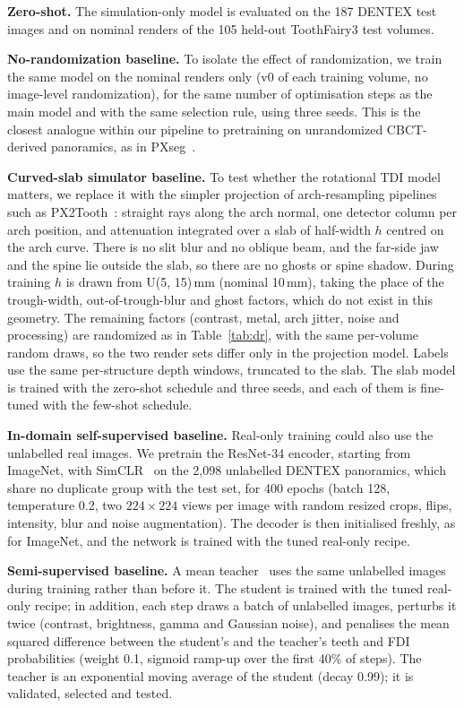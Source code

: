 \documentclass[preprint,12pt]{elsarticle}
\begin{document}
\textbf{Zero-shot.} The simulation-only model is evaluated on the 187 DENTEX test images and on nominal renders of the
105 held-out ToothFairy3 test volumes.

\textbf{No-randomization baseline.} To isolate the effect of randomization, we train the same model on the nominal
renders only (v0 of each training volume, no image-level randomization), for the same number of optimisation steps as
the main model and with the same selection rule, using three seeds. This is the closest analogue within our pipeline to
pretraining on unrandomized CBCT-derived panoramics, as in PXseg~\cite{wang2025}.

\textbf{Curved-slab simulator baseline.} To test whether the rotational TDI model matters, we replace it with the simpler
projection of arch-resampling pipelines such as PX2Tooth~\cite{ma2024}: straight rays along the arch normal, one
detector column per arch position, and attenuation integrated over a slab of half-width $h$ centred on the arch curve.
There is no slit blur and no oblique beam, and the far-side jaw and the spine lie outside the slab, so there are no
ghosts or spine shadow. During training $h$ is drawn from U(5, 15)\,mm (nominal 10\,mm), taking the place of the
trough-width, out-of-trough-blur and ghost factors, which do not exist in this geometry. The remaining factors (contrast,
metal, arch jitter, noise and processing) are randomized as in Table~\ref{tab:dr}, with the
same per-volume random draws, so the two render sets differ only in the projection model. Labels use the same
per-structure depth windows, truncated to the slab. The slab model is trained with the zero-shot schedule and three seeds, and each of them is
fine-tuned with the few-shot schedule.

\textbf{In-domain self-supervised baseline.} Real-only training could also use the unlabelled real images. We
pretrain the ResNet-34 encoder, starting from ImageNet, with SimCLR~\cite{chen2020} on the 2,098 unlabelled DENTEX
panoramics, which share no duplicate group with the test set, for 400 epochs (batch 128, temperature 0.2, two $224\times224$
views per image with random resized crops, flips, intensity, blur and noise augmentation). The decoder is then
initialised freshly, as for ImageNet, and the network is trained with the tuned real-only recipe.

\textbf{Semi-supervised baseline.} A mean teacher~\cite{tarvainen2017} uses the same unlabelled images during training
rather than before it. The student is trained with the tuned real-only recipe; in addition, each step draws a batch of
unlabelled images, perturbs it twice (contrast, brightness, gamma and Gaussian noise), and penalises the mean squared
difference between the student's and the teacher's teeth and FDI probabilities (weight 0.1, sigmoid ramp-up over the
first 40\% of steps). The teacher is an exponential moving average of the student (decay 0.99); it is validated,
selected and tested.
\end{document}
